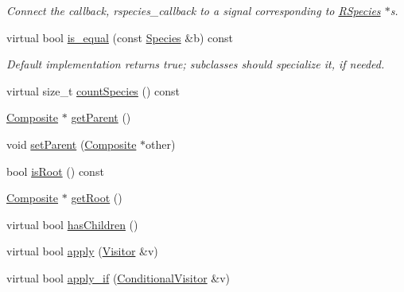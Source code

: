 \begin{DoxyCompactItemize}
\begin{DoxyCompactList}\small\item\em Connect the callback, rspecies\-\_\-callback to a signal corresponding to \hyperlink{classchem_1_1RSpecies}{R\-Species} $\ast$s. \end{DoxyCompactList}\item 
virtual bool \hyperlink{classchem_1_1Species_ac01be786c36974eb1e288b1bfdbf02f2}{is\-\_\-equal} (const \hyperlink{classchem_1_1Species}{Species} \&b) const 
\begin{DoxyCompactList}\small\item\em Default implementation returns true; subclasses should specialize it, if needed. \end{DoxyCompactList}\item 
virtual size\-\_\-t \hyperlink{classchem_1_1Species_a5e8aedfe4c4b5e08fb0ee672c3d80ace}{count\-Species} () const 
\item 
\hyperlink{classchem_1_1Composite}{Composite} $\ast$ \hyperlink{classchem_1_1Component_a32812270ee52f07ceae2194c56864fd6}{get\-Parent} ()
\item 
void \hyperlink{classchem_1_1Component_a1f4e4d1566f1d3026f1e2a14fa3dffd9}{set\-Parent} (\hyperlink{classchem_1_1Composite}{Composite} $\ast$other)
\item 
bool \hyperlink{classchem_1_1Component_a75cd13a0d884f82fcddd574de33fbfe6}{is\-Root} () const 
\item 
\hyperlink{classchem_1_1Composite}{Composite} $\ast$ \hyperlink{classchem_1_1Component_a7f1166f8fb4c9526cd1794ec3c2714f5}{get\-Root} ()
\item 
virtual bool \hyperlink{classchem_1_1Component_aca92f700484a1ad36c2e656e307fe263}{has\-Children} ()
\item 
virtual bool \hyperlink{classchem_1_1Component_ae9efcf2fb203ab7514f81f04d7e4dec2}{apply} (\hyperlink{classchem_1_1Visitor}{Visitor} \&v)
\item 
virtual bool \hyperlink{classchem_1_1Component_ac40e9d75a554324ba1d007a2d5234a38}{apply\-\_\-if} (\hyperlink{classchem_1_1ConditionalVisitor}{Conditional\-Visitor} \&v)
\end{DoxyCompactItemize}
